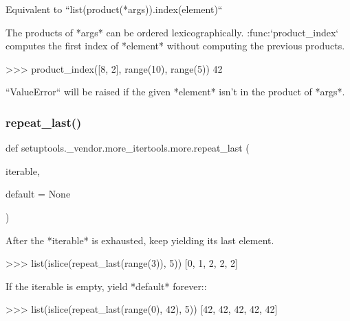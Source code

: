 \begin{DoxyVerb}Equivalent to ``list(product(*args)).index(element)``

The products of *args* can be ordered lexicographically.
:func:`product_index` computes the first index of *element* without
computing the previous products.

    >>> product_index([8, 2], range(10), range(5))
    42

``ValueError`` will be raised if the given *element* isn't in the product
of *args*.
\end{DoxyVerb}
 \mbox{\label{namespacesetuptools_1_1__vendor_1_1more__itertools_1_1more_adb278421baa6650376378b987f55c932}} 
\subsubsection{\texorpdfstring{repeat\+\_\+last()}{repeat\_last()}}
{\footnotesize\ttfamily def setuptools.\+\_\+vendor.\+more\+\_\+itertools.\+more.\+repeat\+\_\+last (\begin{DoxyParamCaption}\item[{}]{iterable,  }\item[{}]{default = {\ttfamily None} }\end{DoxyParamCaption})}

\begin{DoxyVerb}After the *iterable* is exhausted, keep yielding its last element.

    >>> list(islice(repeat_last(range(3)), 5))
    [0, 1, 2, 2, 2]

If the iterable is empty, yield *default* forever::

    >>> list(islice(repeat_last(range(0), 42), 5))
    [42, 42, 42, 42, 42]\end{DoxyVerb}
 \mbox{\label{namespacesetuptools_1_1__vendor_1_1more__itertools_1_1more_a11b819d5b236ecfc8d5ef96808e0f6ff}} 
